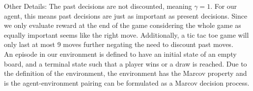 \documentclass[10pt]{article}
\newcommand{\1}{\mathbb{1}}
\begin{document}
Other Details: The past decisions are not discounted, meaning $\gamma = 1$. For our agent, this means past decisions are just as important as present decisions. Since we only evaluate reward at the end of the game considering the whole game as equally important seems like the right move. Additionally, a tic tac toe game will only last at most 9 moves further negating the need to discount past moves.\\

An episode in our environment is defined to have an initial state of an empty board, and a terminal state such that a player wins or a draw is reached. Due to the definition of the environment, the environment has the Marcov property and is the agent-environment pairing can be formulated as a Marcov decision process.

\noindent \underline{\hspace{3in}}\\
\end{document}
